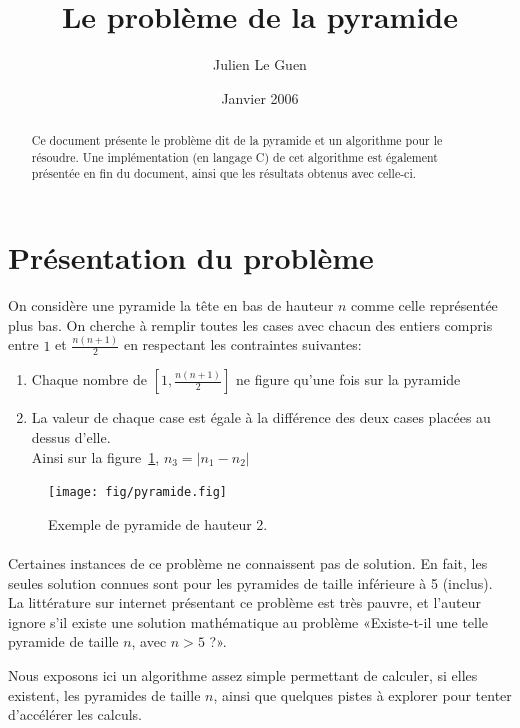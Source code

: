 \documentclass[10pt]{article}%
\title{Le problème de la pyramide}
\author{Julien Le Guen}
\date{Janvier 2006}
\begin{document}
\maketitle

\begin{abstract}
Ce document présente le problème dit de la pyramide et un algorithme pour le résoudre.
Une implémentation (en langage C) de cet algorithme est également présentée en fin du document,
ainsi que les résultats obtenus avec celle-ci.
\end{abstract}

\section{Présentation du problème}
On considère une pyramide la tête en bas de hauteur $n$ comme celle
représentée plus bas. On cherche à remplir toutes les cases avec chacun des
entiers compris entre $1$ et $\frac{n(n+1)}{2}$ en respectant les contraintes
suivantes:
\begin{enumerate}
\item Chaque nombre de $\left[1,\frac{n(n+1)}{2}\right]$ ne figure qu'une fois sur la pyramide
\item La valeur de chaque case est égale à la différence des deux cases placées
  au dessus d'elle.\\
  Ainsi sur la figure~\ref{fig:exemple}, $n_3=|n_1 - n_2|$
\end{enumerate}

\begin{figure}[h]
  \centering
  \texttt{[image: fig/pyramide.fig]} \vspace{-.5\baselineskip}
  \caption{Exemple de pyramide de hauteur 2.}
  \label{fig:exemple}
\end{figure}

\paragraph*{}
  Certaines instances de ce problème ne connaissent pas de solution. En fait, les seules
  solution connues sont pour les pyramides de taille inférieure à 5 (inclus).
  La littérature sur internet présentant ce problème est très pauvre, et l'auteur ignore
  s'il existe une solution mathématique au problème «Existe-t-il une telle pyramide de taille $n$, 
  avec $n > 5$ ?».

  Nous exposons ici un algorithme assez simple permettant de calculer, si elles existent,
  les pyramides de taille $n$, ainsi que quelques pistes à explorer pour tenter d'accélérer les calculs.
\end{document}
